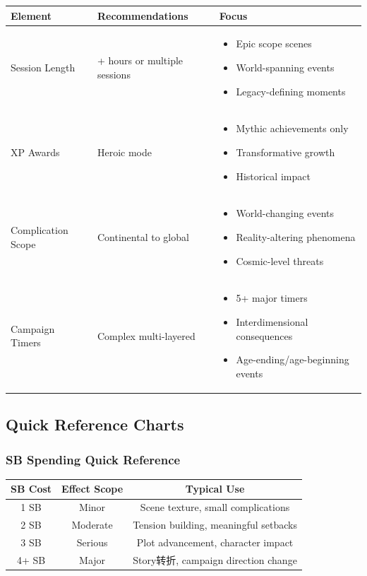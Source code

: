 \documentclass[11pt,letterpaper]{article}
\begin{document}
\begin{longtable}{|>{\raggedright\arraybackslash}p{3cm}|>{\raggedright\arraybackslash}p{4cm}|>{\raggedright\arraybackslash}p{5cm}|}
\hline
\textbf{Element} & \textbf{Recommendations} & \textbf{Focus} \\
\hline
Session Length & 6+ hours or multiple sessions & 
\begin{itemize}
    \item Epic scope scenes
    \item World-spanning events
    \item Legacy-defining moments
\end{itemize} \\
\hline
XP Awards & Heroic mode & 
\begin{itemize}
    \item Mythic achievements only
    \item Transformative growth
    \item Historical impact
\end{itemize} \\
\hline
Complication Scope & Continental to global & 
\begin{itemize}
    \item World-changing events
    \item Reality-altering phenomena
    \item Cosmic-level threats
\end{itemize} \\
\hline
Campaign Timers & Complex multi-layered & 
\begin{itemize}
    \item 5+ major timers
    \item Interdimensional consequences
    \item Age-ending/age-beginning events
\end{itemize} \\
\hline
\end{longtable}

\subsection{Quick Reference Charts}

\subsubsection{SB Spending Quick Reference}

\begin{center}
\begin{tabular}{|c|c|c|}
\hline
\textbf{SB Cost} & \textbf{Effect Scope} & \textbf{Typical Use} \\
\hline
1 SB & Minor & Scene texture, small complications \\
\hline
2 SB & Moderate & Tension building, meaningful setbacks \\
\hline
3 SB & Serious & Plot advancement, character impact \\
\hline
4+ SB & Major & Story转折, campaign direction change \\
\hline
\end{tabular}
\end{center}
\end{document}

